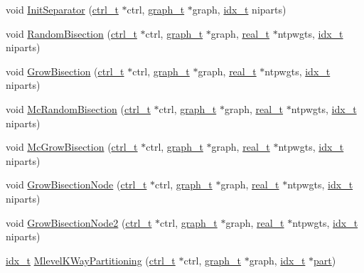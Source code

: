 \begin{DoxyCompactItemize}
\item 
void \hyperlink{a00945_a2927ed69df973d68e918bb74f75b0b70}{Init\+Separator} (\hyperlink{a00742}{ctrl\+\_\+t} $\ast$ctrl, \hyperlink{a00734}{graph\+\_\+t} $\ast$graph, \hyperlink{a00876_aaa5262be3e700770163401acb0150f52}{idx\+\_\+t} niparts)
\item 
void \hyperlink{a00945_ad9f0573a18d3fcfa45d73c3bef80e5f8}{Random\+Bisection} (\hyperlink{a00742}{ctrl\+\_\+t} $\ast$ctrl, \hyperlink{a00734}{graph\+\_\+t} $\ast$graph, \hyperlink{a00876_a1924a4f6907cc3833213aba1f07fcbe9}{real\+\_\+t} $\ast$ntpwgts, \hyperlink{a00876_aaa5262be3e700770163401acb0150f52}{idx\+\_\+t} niparts)
\item 
void \hyperlink{a00945_aa565fcd8af582579b67153287a07ea69}{Grow\+Bisection} (\hyperlink{a00742}{ctrl\+\_\+t} $\ast$ctrl, \hyperlink{a00734}{graph\+\_\+t} $\ast$graph, \hyperlink{a00876_a1924a4f6907cc3833213aba1f07fcbe9}{real\+\_\+t} $\ast$ntpwgts, \hyperlink{a00876_aaa5262be3e700770163401acb0150f52}{idx\+\_\+t} niparts)
\item 
void \hyperlink{a00945_a3ac013a2933e687d40aee2496120367e}{Mc\+Random\+Bisection} (\hyperlink{a00742}{ctrl\+\_\+t} $\ast$ctrl, \hyperlink{a00734}{graph\+\_\+t} $\ast$graph, \hyperlink{a00876_a1924a4f6907cc3833213aba1f07fcbe9}{real\+\_\+t} $\ast$ntpwgts, \hyperlink{a00876_aaa5262be3e700770163401acb0150f52}{idx\+\_\+t} niparts)
\item 
void \hyperlink{a00945_af361dc8ba850849b9230c5c7c8c8c582}{Mc\+Grow\+Bisection} (\hyperlink{a00742}{ctrl\+\_\+t} $\ast$ctrl, \hyperlink{a00734}{graph\+\_\+t} $\ast$graph, \hyperlink{a00876_a1924a4f6907cc3833213aba1f07fcbe9}{real\+\_\+t} $\ast$ntpwgts, \hyperlink{a00876_aaa5262be3e700770163401acb0150f52}{idx\+\_\+t} niparts)
\item 
void \hyperlink{a00945_a5882ab0f565a5e97581ad5c4847effbc}{Grow\+Bisection\+Node} (\hyperlink{a00742}{ctrl\+\_\+t} $\ast$ctrl, \hyperlink{a00734}{graph\+\_\+t} $\ast$graph, \hyperlink{a00876_a1924a4f6907cc3833213aba1f07fcbe9}{real\+\_\+t} $\ast$ntpwgts, \hyperlink{a00876_aaa5262be3e700770163401acb0150f52}{idx\+\_\+t} niparts)
\item 
void \hyperlink{a00945_a3668b93d256689991e65a85536f533c5}{Grow\+Bisection\+Node2} (\hyperlink{a00742}{ctrl\+\_\+t} $\ast$ctrl, \hyperlink{a00734}{graph\+\_\+t} $\ast$graph, \hyperlink{a00876_a1924a4f6907cc3833213aba1f07fcbe9}{real\+\_\+t} $\ast$ntpwgts, \hyperlink{a00876_aaa5262be3e700770163401acb0150f52}{idx\+\_\+t} niparts)
\item 
\hyperlink{a00876_aaa5262be3e700770163401acb0150f52}{idx\+\_\+t} \hyperlink{a00945_a7973c78504ad6711d3516082b1112805}{Mlevel\+K\+Way\+Partitioning} (\hyperlink{a00742}{ctrl\+\_\+t} $\ast$ctrl, \hyperlink{a00734}{graph\+\_\+t} $\ast$graph, \hyperlink{a00876_aaa5262be3e700770163401acb0150f52}{idx\+\_\+t} $\ast$\hyperlink{a00879_a0a9ea8670f88d6db1e021fee2dcd94be}{part})

\end{DoxyCompactItemize}

